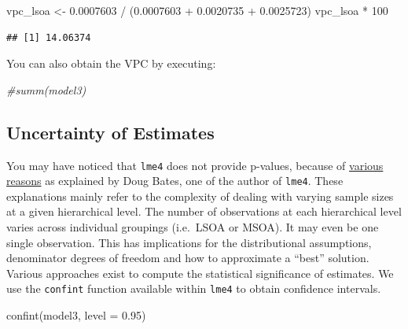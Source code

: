 \documentclass[
]{book}
\newenvironment{Shaded}{\begin{snugshade}}{\end{snugshade}}
\newcommand{\AttributeTok}[1]{\textcolor[rgb]{0.77,0.63,0.00}{#1}}
\newcommand{\CommentTok}[1]{\textcolor[rgb]{0.56,0.35,0.01}{\textit{#1}}}
\newcommand{\DecValTok}[1]{\textcolor[rgb]{0.00,0.00,0.81}{#1}}
\newcommand{\FloatTok}[1]{\textcolor[rgb]{0.00,0.00,0.81}{#1}}
\newcommand{\FunctionTok}[1]{\textcolor[rgb]{0.00,0.00,0.00}{#1}}
\newcommand{\NormalTok}[1]{#1}
\newcommand{\OtherTok}[1]{\textcolor[rgb]{0.56,0.35,0.01}{#1}}
\newcommand{\SpecialCharTok}[1]{\textcolor[rgb]{0.00,0.00,0.00}{#1}}
\begin{document}
\begin{Shaded}
\begin{Highlighting}[]
\NormalTok{vpc\_lsoa }\OtherTok{\textless{}{-}} \FloatTok{0.0007603} \SpecialCharTok{/}\NormalTok{ (}\FloatTok{0.0007603} \SpecialCharTok{+} \FloatTok{0.0020735} \SpecialCharTok{+} \FloatTok{0.0025723}\NormalTok{)}
\NormalTok{vpc\_lsoa }\SpecialCharTok{*} \DecValTok{100}
\end{Highlighting}
\end{Shaded}

\begin{verbatim}
## [1] 14.06374
\end{verbatim}

You can also obtain the VPC by executing:

\begin{Shaded}
\begin{Highlighting}[]
\CommentTok{\#summ(model3)}
\end{Highlighting}
\end{Shaded}

\hypertarget{uncertainty-of-estimates}{%
\subsection{Uncertainty of Estimates}\label{uncertainty-of-estimates}}

You may have noticed that \texttt{lme4} does not provide p-values, because of \href{https://stat.ethz.ch/pipermail/r-help/2006-May/094765.html}{various reasons} as explained by Doug Bates, one of the author of \texttt{lme4}. These explanations mainly refer to the complexity of dealing with varying sample sizes at a given hierarchical level. The number of observations at each hierarchical level varies across individual groupings (i.e.~LSOA or MSOA). It may even be one single observation. This has implications for the distributional assumptions, denominator degrees of freedom and how to approximate a ``best'' solution. Various approaches exist to compute the statistical significance of estimates. We use the \texttt{confint} function available within \texttt{lme4} to obtain confidence intervals.

\begin{Shaded}
\begin{Highlighting}[]
\FunctionTok{confint}\NormalTok{(model3, }\AttributeTok{level =} \FloatTok{0.95}\NormalTok{)}
\end{Highlighting}
\end{Shaded}
\end{document}
